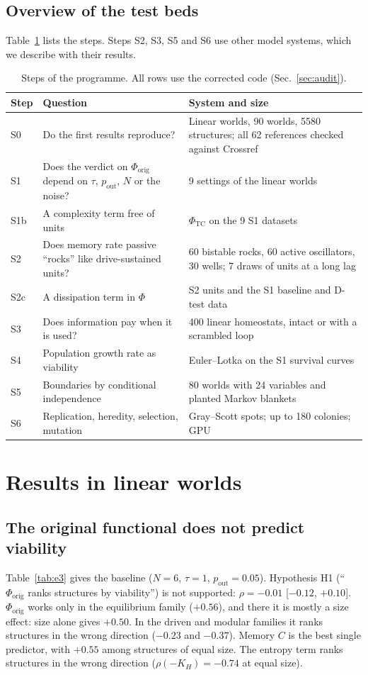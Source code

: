 \documentclass[11pt]{article}
\newcommand{\Phiorig}{\Phi_{\mathrm{orig}}}
\newcommand{\PhiTC}{\Phi_{\mathrm{TC}}}
\newcommand{\pout}{p_{\mathrm{out}}}
\begin{document}
\subsection{Overview of the test beds}
Table~\ref{tab:steps} lists the steps. Steps S2, S3, S5 and S6 use other model systems, which we describe with their
results.

\begin{table}[t]
\centering
\small
\caption{Steps of the programme. All rows use the corrected code (Sec.~\ref{sec:audit}).}
\label{tab:steps}
\begin{tabular}{@{}l p{4.4cm} p{7.6cm}@{}}
\toprule
Step & Question & System and size \\
\midrule
S0 & Do the first results reproduce? & Linear worlds, 90 worlds, 5580 structures; all 62 references checked against Crossref \\
S1 & Does the verdict on $\Phiorig$ depend on $\tau$, $\pout$, $N$ or the noise? & 9 settings of the linear worlds \\
S1b & A complexity term free of units & $\PhiTC$ on the 9 S1 datasets \\
S2 & Does memory rate passive ``rocks'' like drive-sustained units? & 60 bistable rocks, 60 active oscillators, 30 wells; 7 draws of units at a long lag \\
S2c & A dissipation term in $\Phi$ & S2 units and the S1 baseline and D-test data \\
S3 & Does information pay when it is used? & 400 linear homeostats, intact or with a scrambled loop \\
S4 & Population growth rate as viability & Euler--Lotka on the S1 survival curves \\
S5 & Boundaries by conditional independence & 80 worlds with 24 variables and planted Markov blankets \\
S6 & Replication, heredity, selection, mutation & Gray--Scott spots; up to 180 colonies; GPU \\
\bottomrule
\end{tabular}
\end{table}

\section{Results in linear worlds}
\label{sec:linear}

\subsection{The original functional does not predict viability}
Table~\ref{tab:e3} gives the baseline ($N=6$, $\tau=1$, $\pout=0.05$). Hypothesis H1 (``$\Phiorig$ ranks structures by
viability'') is not supported: $\rho = -0.01$ [$-0.12$, $+0.10$]. $\Phiorig$ works only in the equilibrium family
($+0.56$), and there it is mostly a size effect: size alone gives $+0.50$. In the driven and modular families it ranks
structures in the wrong direction ($-0.23$ and $-0.37$). Memory $C$ is the best single predictor, with $+0.55$ among
structures of equal size. The entropy term ranks structures in the wrong direction ($\rho(-K_H) = -0.74$ at equal size).
\end{document}
